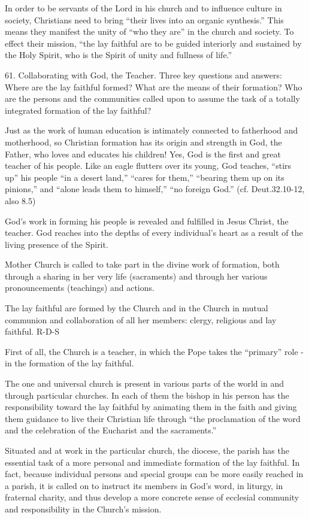 \documentclass[oneside]{book}
\begin{document}
In order to be servants of the Lord in his church and to influence culture in
society, Christians need to bring ``their lives into an organic synthesis.''
This means they manifest the unity of ``who they are'' in the church and
society. To effect their mission, ``the lay faithful are to be guided interiorly
and sustained by the Holy Spirit, who is the Spirit of unity and fullness of
life.''

61. Collaborating with God, the Teacher. Three key questions and answers: Where
are the lay faithful formed? What are the means of their formation? Who are the
persons and the communities called upon to assume the task of a totally
integrated formation of the lay faithful?

Just as the work of human education is intimately connected to fatherhood and
motherhood, so Christian formation has its origin and strength in God, the
Father, who loves and educates his children! Yes, God is the first and great
teacher of his people. Like an eagle flutters over its young, God teaches,
``stirs up'' his people ``in a desert land,'' ``cares for them,''  ``bearing
them up on its pinions,'' and ``alone leads them to himself,'' ``no foreign
God.'' (cf. Deut.32.10-12, also 8.5)

God's work in forming his people is revealed and fulfilled in Jesus Christ, the
teacher. God reaches into the depths of every individual's heart as a result of
the living presence of the Spirit.

Mother Church is called to take part in the divine work of formation, both
through a sharing in her very life (sacraments) and through her various
pronouncements (teachings) and actions.

The lay faithful are formed by the Church and in the Church in mutual communion
and collaboration of all her members: clergy, religious and lay faithful.
R-D-S

First of all, the Church is a teacher, in which the Pope takes the ``primary''
role -in the formation of the lay faithful.

The one and universal church is present in various parts of the world in and
through particular churches. In each of them the bishop in his person has the
responsibility toward the lay faithful by animating them in the faith and giving
them guidance to live their Christian life through ``the proclamation of the
word and the celebration of the Eucharist and the sacraments.''

Situated and at work in the particular church, the diocese, the parish has the
essential task of a more personal and immediate formation of the lay
faithful. In fact, because individual persons and special groups can be more
easily reached in a parish, it is called on to instruct its members in God's
word, in liturgy, in fraternal charity, and thus develop a more concrete sense
of ecclesial community and responsibility in the Church's mission.
\end{document}
